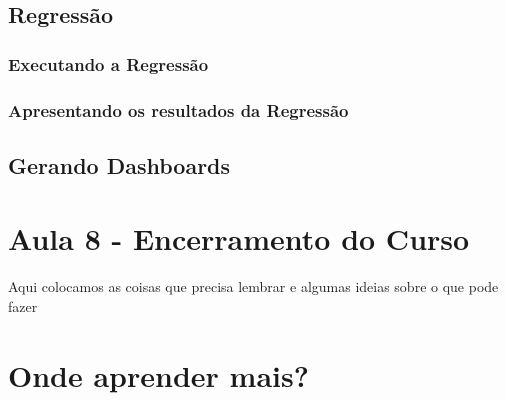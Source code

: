 \documentclass[12pt,a4paper,oneside]{erdc}
\begin{document}
	\section{Regressão}
	
		\subsection{Executando a Regressão}
		
		\subsection{Apresentando os resultados da Regressão}
	
	\section{Gerando Dashboards}




%
%
%


\chapter{Aula 8 - Encerramento do Curso}


Aqui colocamos as coisas que precisa lembrar e algumas ideias sobre o que pode fazer

\chapter{Onde aprender mais?}



%








\end{document}
